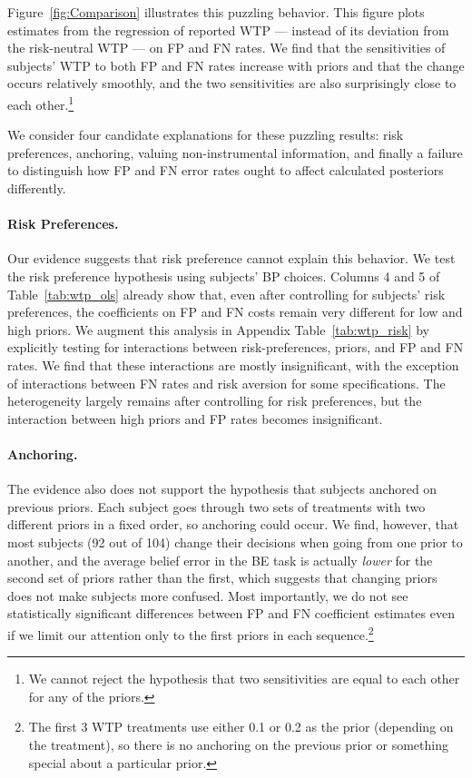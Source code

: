 \documentclass[12pt,a4paper]{article}
\begin{document}
Figure~\ref{fig:Comparison} illustrates this puzzling behavior. This figure plots estimates from the regression of reported WTP --- instead of its deviation from the risk-neutral WTP --- on FP and FN rates. We find that the sensitivities of subjects' WTP to both FP and FN rates increase with priors and that the change occurs relatively smoothly, and the two sensitivities are also surprisingly close to each other.\footnote{We cannot reject the hypothesis that two sensitivities are equal to each other for any of the priors.} 

We consider four candidate explanations for these puzzling results: risk preferences, anchoring, valuing non-instrumental information, and finally a failure to distinguish how FP and FN error rates ought to affect calculated posteriors differently. 

\paragraph{Risk Preferences.} Our evidence suggests that risk preference cannot explain this behavior. We test the risk preference hypothesis using subjects' BP choices. Columns 4 and 5 of Table~\ref{tab:wtp_ols} already show that, even after controlling for subjects' risk preferences, the coefficients on FP and FN costs remain very different for low and high priors.  We augment this analysis in Appendix Table~\ref{tab:wtp_risk} by explicitly testing for interactions between risk-preferences, priors, and FP and FN rates. We find that these interactions are mostly insignificant, with the exception of interactions between FN rates and risk aversion for some specifications. The heterogeneity largely remains after controlling for risk preferences, but the interaction between high priors and FP rates becomes insignificant.

\paragraph{Anchoring.} The evidence also does not support the hypothesis that subjects anchored on previous priors. Each subject goes through two sets of treatments with two different priors in a fixed order, so anchoring could occur.  We find, however, that most subjects (92 out of 104) change their decisions when going from one prior to another, and the average belief error in the BE task is actually \emph{lower} for the second set of priors rather than the first, which suggests that changing priors does not make subjects more confused. Most importantly, we do not see statistically significant differences between FP and FN coefficient estimates even if we limit our attention only to the first priors in each sequence.\footnote{The first 3 WTP treatments use either 0.1 or 0.2 as the prior (depending on the treatment), so there is no anchoring on the previous prior or something special about a particular prior.}
\end{document}
